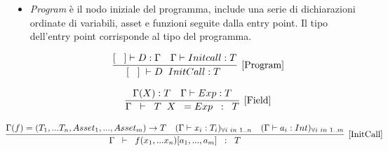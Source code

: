 \documentclass[12pt,twoside,openright,a4paper]{report}
\begin{document}
\begin{itemize}
    \item \textit{Program} è il nodo iniziale del programma, include una serie di dichiarazioni ordinate di variabili, asset e funzioni seguite dalla entry point. Il tipo dell'entry point corrisponde al tipo del programma.
    
    \begin{align*}
    \infer[\mathrm{[Program]}]
    {[\hspace{0.3cm}] \hspace{0.1cm} \vdash  D\hspace{0.2cm} InitCall : T \hspace{0.1cm} } 
    {  [\hspace{0.3cm}] \vdash D : \Gamma & \Gamma \vdash Initcall: T }
    \end{align*}
    
    \begin{align*}
    \infer[\mathrm{[Field]}]
    {\Gamma  \hspace{0.2cm} \vdash \hspace{0.2cm} T \hspace{0.2cm} X \hspace{0.2cm} = Exp\hspace{0.2cm}: \hspace{0.2cm} T} 
    { \Gamma(X) : T & \Gamma\vdash Exp:T }
    \end{align*}
    
    \begin{align*}
    \hspace{-1cm}
    \infer[\mathrm{[InitCall]}]
    {\Gamma  \hspace{0.2cm} \vdash \hspace{0.2cm} f(x_{1}, ...x_{n})[a_{1}, ..., a_{m}] \hspace{0.2cm} : \hspace{0.2cm} T} 
    {  \Gamma (f) = (T_{1},...T_{n},Asset_{1},...,Asset_{m}) \to T  & (\Gamma \vdash x_{i} : T_{i})_{\forall{i \hspace{0.1cm}in \hspace{0.1cm} 1..n}} & (\Gamma \vdash a_{i} : Int)_{\forall{i \hspace{0.1cm} in  \hspace{0.1cm}1..m}}}
    \end{align*}
\end{itemize}
\end{document}
